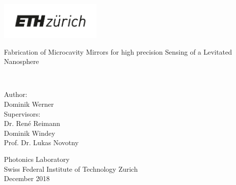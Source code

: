\thispagestyle{empty}
\begin{flushleft}
	\includegraphics[width=5cm]{source/eth_logo_kurz_pos}
\end{flushleft}


\vspace*{2.2cm}
\begin{center}


{
    \huge\sffamily\bfseries

  

  Fabrication of Microcavity Mirrors for high precision Sensing of a Levitated Nanosphere\\%
}
	\vspace{3.0cm}
		{\large{}}\\
			\vspace*{2.2cm}

  {\large\sffamily Author:} \\ \vspace{1ex}
  {\large\sffamily Dominik Werner} \\
  \vspace{2.2cm} 
  {\large \sffamily Supervisors:} \\ \vspace{1ex}
  {\large \sffamily Dr. Ren\'{e} Reimann} \\ \vspace{1ex}
  {\large \sffamily Dominik Windey} \\ \vspace{1ex}
  {\large \sffamily Prof. Dr. Lukas Novotny} \\ \vspace{2cm}
  
 
  {\large \sffamily Photonics Laboratory} \\ \vspace{1ex}
  {\large \sffamily Swiss Federal Institute of Technology Zurich} \\ \vspace{2.2cm}
  {\large \sffamily December 2018} \\ \vspace{5ex}

\end{center}

\restoregeometry
